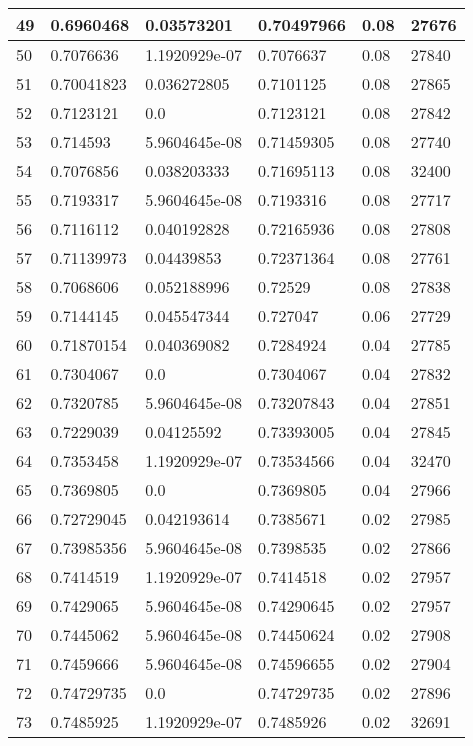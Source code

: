 \begin{longtable}{|l|l|l|l|l|l|}
49 & 0.6960468 & 0.03573201 & 0.70497966 & 0.08 & 27676 \\ \hline 
50 & 0.7076636 & 1.1920929e-07 & 0.7076637 & 0.08 & 27840 \\ \hline 
51 & 0.70041823 & 0.036272805 & 0.7101125 & 0.08 & 27865 \\ \hline 
52 & 0.7123121 & 0.0 & 0.7123121 & 0.08 & 27842 \\ \hline 
53 & 0.714593 & 5.9604645e-08 & 0.71459305 & 0.08 & 27740 \\ \hline 
54 & 0.7076856 & 0.038203333 & 0.71695113 & 0.08 & 32400 \\ \hline 
55 & 0.7193317 & 5.9604645e-08 & 0.7193316 & 0.08 & 27717 \\ \hline 
56 & 0.7116112 & 0.040192828 & 0.72165936 & 0.08 & 27808 \\ \hline 
57 & 0.71139973 & 0.04439853 & 0.72371364 & 0.08 & 27761 \\ \hline 
58 & 0.7068606 & 0.052188996 & 0.72529 & 0.08 & 27838 \\ \hline 
59 & 0.7144145 & 0.045547344 & 0.727047 & 0.06 & 27729 \\ \hline 
60 & 0.71870154 & 0.040369082 & 0.7284924 & 0.04 & 27785 \\ \hline 
61 & 0.7304067 & 0.0 & 0.7304067 & 0.04 & 27832 \\ \hline 
62 & 0.7320785 & 5.9604645e-08 & 0.73207843 & 0.04 & 27851 \\ \hline 
63 & 0.7229039 & 0.04125592 & 0.73393005 & 0.04 & 27845 \\ \hline 
64 & 0.7353458 & 1.1920929e-07 & 0.73534566 & 0.04 & 32470 \\ \hline 
65 & 0.7369805 & 0.0 & 0.7369805 & 0.04 & 27966 \\ \hline 
66 & 0.72729045 & 0.042193614 & 0.7385671 & 0.02 & 27985 \\ \hline 
67 & 0.73985356 & 5.9604645e-08 & 0.7398535 & 0.02 & 27866 \\ \hline 
68 & 0.7414519 & 1.1920929e-07 & 0.7414518 & 0.02 & 27957 \\ \hline 
69 & 0.7429065 & 5.9604645e-08 & 0.74290645 & 0.02 & 27957 \\ \hline 
70 & 0.7445062 & 5.9604645e-08 & 0.74450624 & 0.02 & 27908 \\ \hline 
71 & 0.7459666 & 5.9604645e-08 & 0.74596655 & 0.02 & 27904 \\ \hline 
72 & 0.74729735 & 0.0 & 0.74729735 & 0.02 & 27896 \\ \hline 
73 & 0.7485925 & 1.1920929e-07 & 0.7485926 & 0.02 & 32691 \\ \hline 

\end{longtable}
